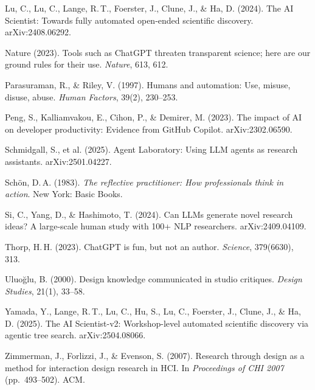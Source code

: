 \documentclass[12pt]{article}
\begin{document}
\begin{list}{}{\setlength{\itemindent}{-2em}\setlength{\leftmargin}{2em}\setlength{\itemsep}{2pt}}
\item Lu, C., Lu, C., Lange, R.\,T., Foerster, J., Clune, J., \& Ha, D. (2024). The AI Scientist: Towards fully automated open-ended scientific discovery. arXiv:2408.06292.

\item Nature (2023). Tools such as ChatGPT threaten transparent science; here are our ground rules for their use. \emph{Nature}, 613, 612.

\item Parasuraman, R., \& Riley, V. (1997). Humans and automation: Use, misuse, disuse, abuse. \emph{Human Factors}, 39(2), 230--253.

\item Peng, S., Kalliamvakou, E., Cihon, P., \& Demirer, M. (2023). The impact of AI on developer productivity: Evidence from GitHub Copilot. arXiv:2302.06590.

\item Schmidgall, S., et al. (2025). Agent Laboratory: Using LLM agents as research assistants. arXiv:2501.04227.

\item Schön, D.\,A. (1983). \emph{The reflective practitioner: How professionals think in action}. New York: Basic Books.

\item Si, C., Yang, D., \& Hashimoto, T. (2024). Can LLMs generate novel research ideas? A large-scale human study with 100+ NLP researchers. arXiv:2409.04109.

\item Thorp, H.\,H. (2023). ChatGPT is fun, but not an author. \emph{Science}, 379(6630), 313.

\item Uluoğlu, B. (2000). Design knowledge communicated in studio critiques. \emph{Design Studies}, 21(1), 33--58.

\item Yamada, Y., Lange, R.\,T., Lu, C., Hu, S., Lu, C., Foerster, J., Clune, J., \& Ha, D. (2025). The AI Scientist-v2: Workshop-level automated scientific discovery via agentic tree search. arXiv:2504.08066.

\item Zimmerman, J., Forlizzi, J., \& Evenson, S. (2007). Research through design as a method for interaction design research in HCI. In \emph{Proceedings of CHI 2007} (pp.\ 493--502). ACM.

\end{list}
\end{document}
